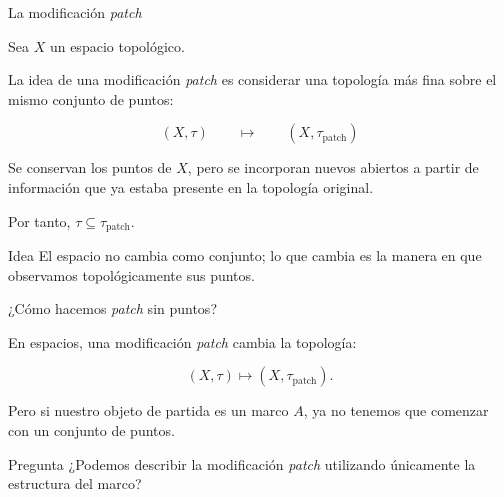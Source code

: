 \documentclass[compress,12pt]{beamer}
\begin{document}
\begin{frame}{La modificación \textit{patch}}
\small

Sea $X$ un espacio topológico.

\medskip

La idea de una modificación \textit{patch} es considerar
una topología más fina sobre el mismo conjunto de puntos:

\[
\boxed{
(X,\tau)
\qquad\longmapsto\qquad
(X,\tau_{\mathrm{patch}})
}
\]

\pause

\medskip

Se conservan los puntos de $X$, pero se incorporan nuevos abiertos
a partir de información que ya estaba presente en la topología original.

\pause

\bigskip

Por tanto, $\tau\subseteq\tau_{\mathrm{patch}}$.


\begin{block}{Idea}
\centering
El espacio no cambia como conjunto; lo que cambia es
la manera en que observamos topológicamente sus puntos.
\end{block}

\end{frame}

\begin{frame}{¿Cómo hacemos \textit{patch} sin puntos?}
\small

En espacios, una modificación \textit{patch} cambia la topología:

\[
(X,\tau)
\longmapsto
(X,\tau_{\mathrm{patch}}).
\]

\pause

\medskip

Pero si nuestro objeto de partida es un marco $A$,
ya no tenemos que comenzar con un conjunto de puntos.

\bigskip

\begin{center}
\end{center}

\pause

\bigskip

\begin{block}{Pregunta}
\centering
¿Podemos describir la modificación \textit{patch}
utilizando únicamente la estructura del marco?
\end{block}

\end{frame}
\end{document}
